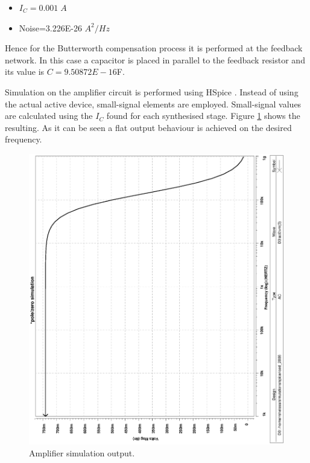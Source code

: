 \documentclass[twocolumn]{IEEEtran}
\begin{document}
\begin{itemize}
\item $I_C=0.001\;A$
\item Noise=3.226E-26 $A^2/Hz$
\end{itemize}

Hence for the Butterworth compensation process it is performed at the feedback network. In this case a capacitor is placed in parallel to the feedback resistor and its value is $C=9.50872E-16$F.

Simulation on the amplifier circuit is performed using HSpice \cite{hspice}. Instead of using the actual active device, \mbox{small-signal} elements are employed. Small-signal values are calculated using the $I_C$ found for each synthesised stage. Figure \ref{fig:sim} shows the resulting. As it can be seen a flat output behaviour is achieved on the desired frequency.

\begin{figure}[hbtp]
	\centering
	\includegraphics[scale=0.3,angle=-90]{figures/iced_2006.ps}
	\caption{Amplifier simulation output.}
	\label{fig:sim}
\end{figure}



\end{document}

